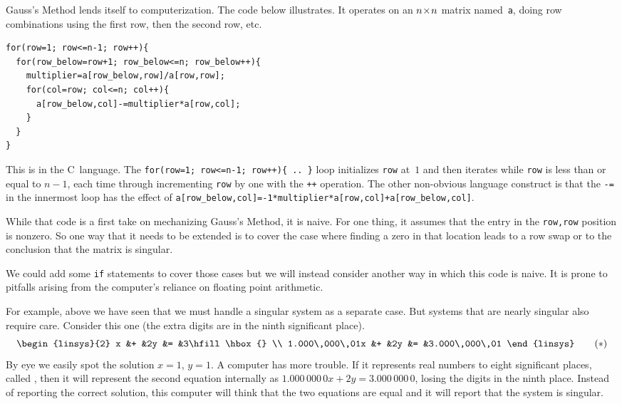 Gauss's Method lends itself to computerization.
The code below illustrates.
It operates on an $n \! \times \! n$ matrix named~\lstinline[style=inline]!a!, 
doing row combinations using the first row, then
the second row, etc.
\begin{lstlisting}
for(row=1; row<=n-1; row++){
  for(row_below=row+1; row_below<=n; row_below++){
    multiplier=a[row_below,row]/a[row,row];
    for(col=row; col<=n; col++){
      a[row_below,col]-=multiplier*a[row,col];
    }
  }
}
\end{lstlisting}
This is in the C~language.
The 
\lstinline[style=inline]!for(row=1; row<=n-1; row++){ .. }!
loop initializes \lstinline[style=inline]!row! at~$1$ and then iterates while
\lstinline[style=inline]!row! is less than or equal to $n-1$, each time through
incrementing \lstinline[style=inline]!row! by one with the 
\lstinline[style=inline]!++! operation.
The other non-obvious language 
construct is that the \lstinline[style=inline]!-=! in the innermost
loop has the effect of
\lstinline[style=inline]!a[row_below,col]=-1*multiplier*a[row,col]+a[row_below,col]!.

While that code is a first take on mechanizing Gauss's Method,
it is naive.
For one thing, it assumes that 
the entry in the
\lstinline[style=inline]!row,row! position is nonzero.
So one way that it needs to be extended is to cover
the case where finding a zero in that location leads to a row swap or to the
conclusion that the matrix is singular.

We could add some \lstinline[style=inline]!if! statements to cover those cases 
but we will instead consider another way in which this code is naive.
It is prone to pitfalls arising from the computer's reliance on 
floating point arithmetic.

For example, above we have seen that we must handle a singular system as
a separate case.
But systems that are nearly singular also require care.
Consider this one (the extra digits are in the ninth significant place).
\begin{equation*}
   \begin{linsys}{2}
                   x &+ &2y &= &3\hfill\hbox{}  \\
     1.000\,000\,01x &+ &2y &= &3.000\,000\,01
   \end{linsys}
   \tag{$*$}
\end{equation*}
By eye we easily spot the solution $x=1$, $y=1$.
A computer has more trouble.
If it represents real numbers to eight significant places, called 
, 
then it will represent the second
equation internally as $1.000\,000\,0x+2y=3.000\,000\,0$, losing the
digits in the ninth place.
Instead of reporting the correct solution, this computer will think that 
the two equations are equal and it will report that the system is 
singular.

